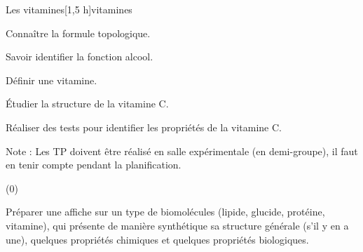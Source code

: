 \begin{multicols}{2}
  \begin{TP}{Les vitamines}[1,5 h]{vitamines}
    \begin{prerequis}
      \item Connaître la formule topologique.
      \item Savoir identifier la fonction alcool.
    \end{prerequis}
    \begin{objectifs}
      \item Définir une vitamine.
      \item Étudier la structure de la vitamine C.
      \item Réaliser des tests pour identifier les propriétés de la vitamine C.
    \end{objectifs}
  \end{TP}
\end{multicols}


Note :
Les TP doivent être réalisé en salle expérimentale (en demi-groupe), il faut en tenir compte pendant la planification.


\newpage
\nomPrenomClasse
{}
\vspace*{12pt}

\vspace*{-353 pt}

\begin{programmeSeance}
\end{programmeSeance}

\begin{programmeSeance}
\end{programmeSeance}

\begin{programmeSeance}[2](0)
\end{programmeSeance}


\begin{tacheFinale}
  Préparer une affiche  sur un type de biomolécules (lipide, glucide, protéine, vitamine), qui présente de manière synthétique sa structure générale  (s'il y en a une), quelques propriétés chimiques et quelques propriétés biologiques.
\end{tacheFinale}


